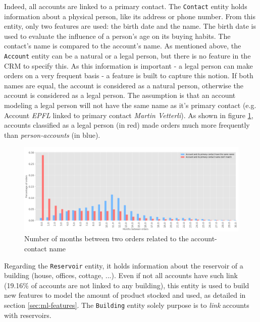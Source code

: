 Indeed, all accounts are linked to a primary contact. The \texttt{Contact} entity holds information about a physical person, like its address or phone number. From this entity, only two features are used: the birth date and the name. The birth date is used to evaluate the influence of a person's age on its buying habits. The contact's name is compared to the account's name. As mentioned above, the \texttt{Account} entity can be a natural or a legal person, but there is no feature in the CRM to specify this. As this information is important - a legal person can make orders on a very frequent basis - a feature is built to capture this notion. If both names are equal, the account is considered as a natural person, otherwise the account is considered as a legal person. The assumption is that an account modeling a legal person will not have the same name as it's primary contact (e.g. Account \textit{EPFL} linked to primary contact \textit{Martin Vetterli}). As shown in figure \ref{fig:account-contact-name-orders}, accounts classified as a legal person (in red) made orders much more frequently than \textit{person-accounts} (in blue).

\begin{figure}[h]
    \centering
    \includegraphics[width=15cm]{images/account-contact-name-orders.png}
    \caption[Influence of account and contact names on order's frequency]{Number of months between two orders related to the account-contact name}
    \label{fig:account-contact-name-orders}
\end{figure}

Regarding the \texttt{Reservoir} entity, it holds information about the reservoir of a building (house, offices, cottage, ...). Even if not all accounts have such link (19.16\% of accounts are not linked to any building), this entity is used to build new features to model the amount of product stocked and used, as detailed in section \ref{sec:ml-features}. The \texttt{Building} entity solely purpose is to \textit{link} accounts with reservoirs.

